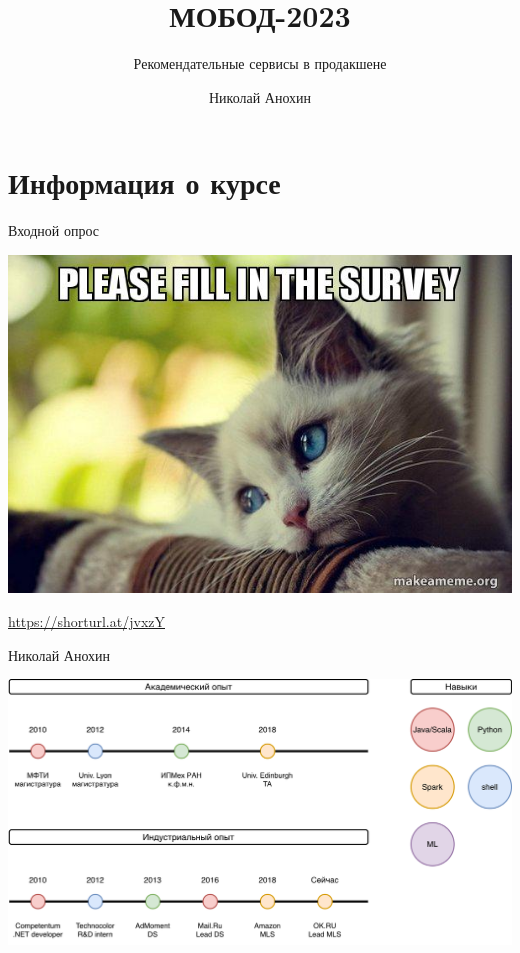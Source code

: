 \documentclass[11pt,aspectratio=169,handout]{beamer}
\author{Николай Анохин}
\title{МОБОД-2023}
\subtitle{Рекомендательные сервисы в продакшене}
\begin{document}
{

\begin{frame}
\titlepage
\end{frame}


}

\section{Информация о курсе}

\begin{frame}{Входной опрос}

\begin{center}
\includegraphics[scale=0.5]{images/please.jpeg}

\url{https://shorturl.at/jvxzY}
\end{center}

\end{frame}

\begin{frame}{Николай Анохин}

\begin{center}
\includegraphics[scale=0.23]{images/about-me.png}
\end{center}

\end{frame}
\end{document}
